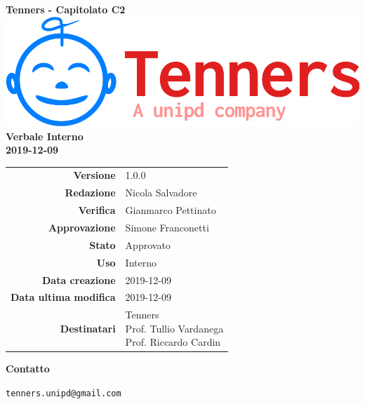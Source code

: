 \begin{titlepage}
	\begin{center}
		\large \textbf{Tenners - Capitolato C2}
		\vfill
		\includegraphics[scale = 0.3]{./res/img/logo.png}\\
		\vfill
		\Huge \textbf{Verbale Interno} \\
		\textbf {2019-12-09}

        \vfill
        \large

        \begin{tabular}{r|l}
                        \textbf{Versione} & 1.0.0 \\
                        \textbf{Redazione} & Nicola Salvadore \\
                        \textbf{Verifica} &  Gianmarco Pettinato \\
                        \textbf{Approvazione} & Simone Franconetti \\
                        \textbf{Stato} & Approvato \\
                        \textbf{Uso} &  Interno\\
                        \textbf{Data creazione} &  2019-12-09\\
                        \textbf{Data ultima modifica} &  2019-12-09\\
                        \textbf{Destinatari} & \parbox[t]{5cm}{Tenners \\ Prof. Tullio Vardanega\\ Prof. Riccardo Cardin}
                \end{tabular}
                \vfill
                \normalsize
                \vfill
                \textbf{Contatto}

                \texttt{tenners.unipd@gmail.com}

	\end{center}
\end{titlepage}
